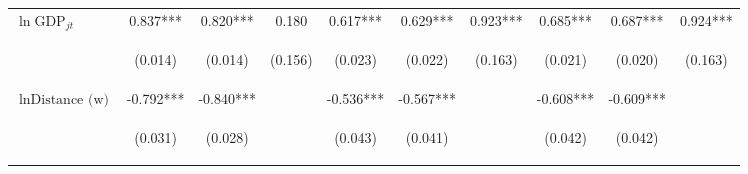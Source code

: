 \begin{center}
\begin{tabular}{lccccccccc}
$\ln\text{GDP}_{jt}$ & 0.837*** & 0.820*** & 0.180 & 0.617*** & 0.629*** & 0.923*** & 0.685*** & 0.687*** & 0.924*** \\
\vspace{4pt} & \begin{footnotesize}(0.014)\end{footnotesize} & \begin{footnotesize}(0.014)\end{footnotesize} & \begin{footnotesize}(0.156)\end{footnotesize} & \begin{footnotesize}(0.023)\end{footnotesize} & \begin{footnotesize}(0.022)\end{footnotesize} & \begin{footnotesize}(0.163)\end{footnotesize} & \begin{footnotesize}(0.021)\end{footnotesize} & \begin{footnotesize}(0.020)\end{footnotesize} & \begin{footnotesize}(0.163)\end{footnotesize} \\
$\ln\text{Distance (w)}$ & -0.792*** & -0.840*** &  & -0.536*** & -0.567*** &  & -0.608*** & -0.609*** &  \\
\vspace{4pt} & \begin{footnotesize}(0.031)\end{footnotesize} & \begin{footnotesize}(0.028)\end{footnotesize} & \begin{footnotesize}\end{footnotesize} & \begin{footnotesize}(0.043)\end{footnotesize} & \begin{footnotesize}(0.041)\end{footnotesize} & \begin{footnotesize}\end{footnotesize} & \begin{footnotesize}(0.042)\end{footnotesize} & \begin{footnotesize}(0.042)\end{footnotesize} & \begin{footnotesize}\end{footnotesize} \\

\end{tabular}
\end{center}
